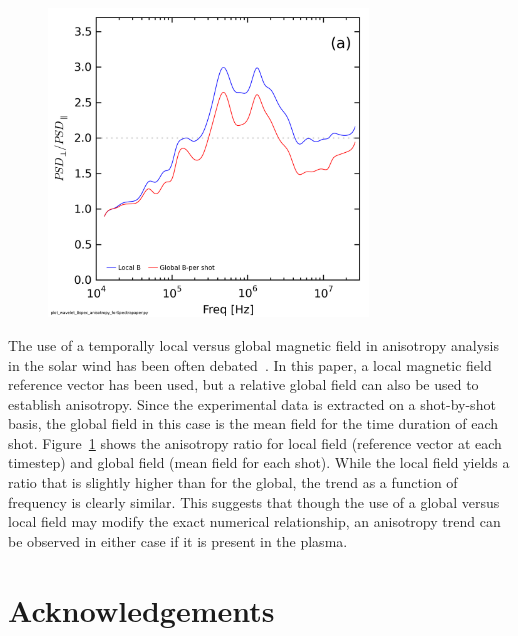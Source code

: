 \documentclass[aip,prl,amsmath,amssymb,reprint,superscriptaddress]{revtex4-1} %
\begin{document}
\begin{figure}[!htbp]
\centerline{
\includegraphics[width=8.5cm]{BperpparaGlobalBcomp_chan1t4_1mWbspectra}}
\caption{\label{fig:globalcomparison}}
\end{figure}

The use of a temporally local versus global magnetic field in anisotropy analysis in the solar wind has been often debated~\cite{podesta09,matthaeus12}. In this paper, a local magnetic field reference vector has been used, but a relative global field can also be used to establish anisotropy. Since the experimental data is extracted on a shot-by-shot basis, the global field in this case is the mean field for the time duration of each shot. Figure~\ref{fig:globalcomparison} shows the anisotropy ratio for local field (reference vector at each timestep) and global field (mean field for each shot). While the local field yields a ratio that is slightly higher than for the global, the trend as a function of frequency is clearly similar. This suggests that though the use of a global versus local field may modify the exact numerical relationship, an anisotropy trend can be observed in either case if it is present in the plasma.
\section*{Acknowledgements}
\end{document}

